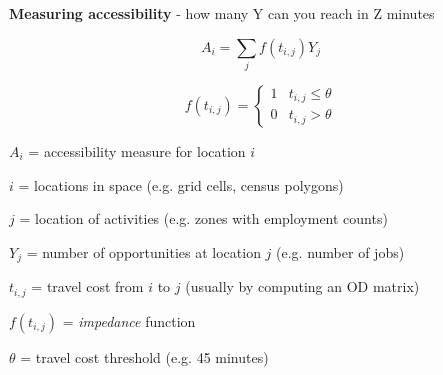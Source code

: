 \documentclass[aspectratio=169]{beamer}
\begin{document}
\begin{frame}
	
	\textbf{Measuring accessibility} - how many Y can you reach in Z minutes
	
	\vspace{1mm}
	
	\[A_i = \sum_j  f(t_{i,j}) Y_j\]
	
	
	\[
	f(t_{i,j}) = \begin{cases}
	1  & t_{i,j} \leq \theta \\
	0 & t_{i,j} > \theta
	\end{cases}\]
	
	
	\vspace{1mm}
	
	$A_i$ = accessibility measure for location $i$
	
	\vspace{1mm}
	
	$i$ = locations in space (e.g. grid cells, census polygons)
	
	\vspace{1mm}
	
	$j$ = location of activities (e.g. zones with employment counts)
	
	\vspace{1mm}
	
	$Y_j$ = number of opportunities at location $j$ (e.g. number of jobs)
	
	\vspace{1mm}
	
	$t_{i,j}$ = travel cost from $i$ to $j$ (usually by computing an OD matrix)
	
	\vspace{1mm}
	
	$f(t_{i,j})$ = \textit{impedance} function
	
	\vspace{1mm}
	
	$\theta$ = travel cost threshold (e.g. 45 minutes)
	
	
\end{frame}
\end{document}
